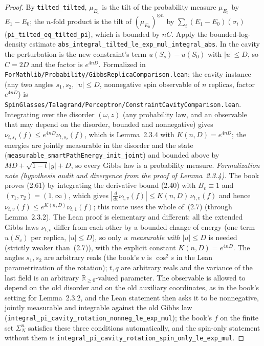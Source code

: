 \begin{proof}
  \leanok
By \texttt{tilted\_tilted}, $\mu_{E_1}$ is the tilt of the probability measure $\mu_{E_0}$ by $E_1-E_0$; the $n$-fold product is the tilt of $(\mu_{E_0})^{\otimes n}$ by $\sum_i(E_1-E_0)(\sigma_i)$ (\texttt{pi\_tilted\_eq\_tilted\_pi}), which is bounded by $nC$. Apply the bounded-log-density estimate \texttt{abs\_integral\_tilted\_le\_exp\_mul\_integral\_abs}. In the cavity the perturbation is the new constraint's term $u(S_s)-u(S_0)$ with $|u|\le D$, so $C=2D$ and the factor is $e^{4nD}$.
Formalized in \texttt{ForMathlib/Probability/GibbsReplicaComparison.lean}; the cavity instance (any two angles $s_1,s_2$, $|u|\le D$, nonnegative spin observable of $n$ replicas, factor $e^{4nD}$) is \texttt{SpinGlasses/Talagrand/Perceptron/ConstraintCavityComparison.lean}. Integrating over the disorder $(\omega,z)$ (any probability law, and an observable that may depend on the disorder, bounded and nonnegative) gives $\nu_{t,s_1}(f)\le e^{4nD}\nu_{t,s_2}(f)$, which is Lemma~2.3.4 with $K(n,D)=e^{4nD}$; the energies are jointly measurable in the disorder and the state (\texttt{measurable\_smartPathEnergy\_init\_joint}) and bounded above by $MD+\sqrt{1-t}|y|+D$, so every Gibbs law is a probability measure.
\emph{Formalization note (hypothesis audit and divergence from the proof of Lemma~2.3.4).} The book proves (2.61) by
integrating the derivative bound (2.40) with $B_v\equiv1$ and $(\tau_1,\tau_2)=(1,\infty)$, which gives
$|\tfrac{d}{dv}\nu_{t,v}(f)|\le K(n,D)\,\nu_{t,v}(f)$ and hence $\nu_{t,v}(f)\le e^{K(n,D)}\nu_{t,1}(f)$; this route
uses the whole of~(2.7) (through Lemma~2.3.2). The Lean proof is elementary and different: all the extended Gibbs
laws $\nu_{t,v}$ differ from each other by a bounded change of energy (one term $u(S_v)$ per replica, $|u|\le D$), so only
\emph{$u$ measurable with $|u|\le D$} is needed (strictly weaker than~(2.7)), with the explicit constant $K(n,D)=e^{4nD}$.
The angles $s_1,s_2$ are arbitrary reals (the book's $v$ is $\cos^2 s$ in the Lean parametrization of the rotation);
$t,q$ are arbitrary reals and the variance of the last field is an arbitrary $\mathbb R_{\ge0}$-valued parameter.
The observable is allowed to depend on the old disorder and on the old auxiliary coordinates, as in the book's setting for
Lemma~2.3.2, and the Lean statement then asks it to be nonnegative, jointly measurable and integrable against the old
Gibbs law (\texttt{integral\_pi\_cavity\_rotation\_nonneg\_le\_exp\_mul}); the book's $f$ on the finite set $\Sigma_N^n$ satisfies
these three conditions automatically, and the spin-only statement without them is
\texttt{integral\_pi\_cavity\_rotation\_spin\_only\_le\_exp\_mul}.
\end{proof}

